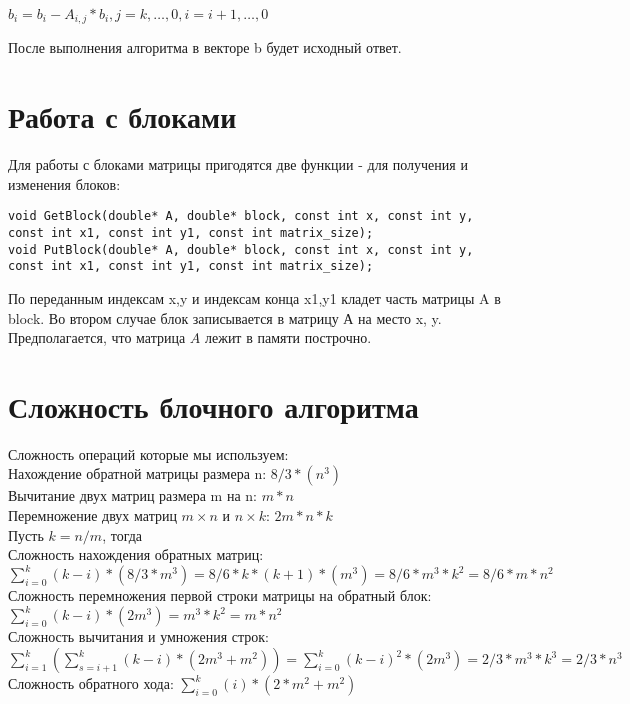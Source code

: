 \documentclass[12pt]{scrreprt}
\begin{document}
\( b_{i} = b_{i} - A_{i,j}*b_{i}, j=k,\ldots,0, i=i+1,\ldots,0\)

После выполнения алгоритма в векторе b будет исходный ответ.
\bigskip

\chapter{Работа с блоками}
Для работы с блоками матрицы пригодятся две функции - для получения и изменения блоков:
\begin{verbatim}
void GetBlock(double* A, double* block, const int x, const int y, const int x1, const int y1, const int matrix_size);
void PutBlock(double* A, double* block, const int x, const int y, const int x1, const int y1, const int matrix_size);
\end{verbatim}

По переданным индексам x,y и индексам конца x1,y1 кладет часть матрицы A в block.
Во втором случае блок записывается в матрицу А на место x, y.
Предполагается, что матрица \(A\) лежит в памяти построчно.
\bigskip

\chapter{Сложность блочного алгоритма}
Сложность операций которые мы используем:\\
Нахождение обратной матрицы размера n: $8/3 * (n^3)$\\
Вычитание двух матриц размера m на n: $m * n$\\
Перемножение двух матриц $m \times n$ и $n \times k$: $2m * n * k$\\

Пусть $ k = n/m $, тогда\\

Сложность нахождения обратных матриц:\\
 $\sum_{i=0}^{k}(k-i)*(8/3 * m^3) = 8/6 * k*(k+1)*(m^3) = 8/6 * m^3 * k^2 = 8/6 * m*n^2$\\

Сложность перемножения первой строки матрицы на обратный блок:\\
 $\sum_{i=0}^{k}(k-i)*(2m^3) = m^3 * k^2 = m*n^2$\\

Сложность вычитания и умножения строк:\\
 $\sum_{i=1}^{k}(\sum_{s=i+1}^{k}(k-i)*(2m^3 + m^2)) = \sum_{i=0}^{k}(k-i)^2*(2m^3) = 2/3 * m^3 * k^3 = 2/3 * n^3 $\\
Сложность обратного хода: $\sum_{i=0}^{k}(i)*(2 * m^2 + m^2)$
\end{document}
